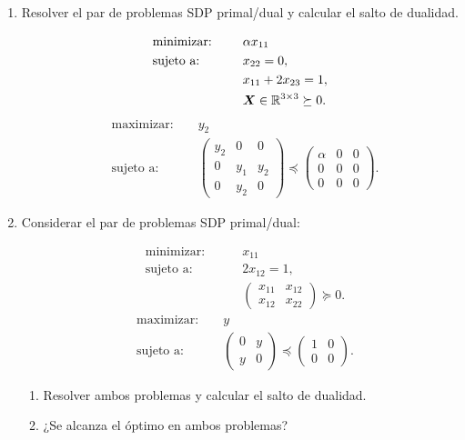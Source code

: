 \documentclass[11pt]{article}
\begin{document}
\begin{enumerate}[resume]
\item Resolver el par de problemas SDP primal/dual y calcular el salto de dualidad.
\begin{multicols}{2}
\noindent
\begin{alignat*}{2}
  & \text{minimizar: } & & \alpha x_{11} \\
  & \text{sujeto a: } & \quad & x_{22} = 0, \\
  & & \quad & x_{11} + 2x_{23} = 1, \\
  & & \quad & \Xb \in \R^{3 \times 3} \succeq 0.
\end{alignat*}
\begin{alignat*}{2}
  & \text{maximizar: } & & y_2 \\
  & \text{sujeto a: } & & \begin{pmatrix} y_2 & 0 & 0 \\ 0 & y_1 & y_2 \\ 0 & y_2 & 0  \end{pmatrix} \preceq \begin{pmatrix} \alpha & 0 & 0 \\ 0 & 0 & 0 \\ 0 & 0 & 0 \end{pmatrix}.
\end{alignat*}
\end{multicols}

\item Considerar el par de problemas SDP primal/dual:
\begin{multicols}{2}
\noindent
\begin{alignat*}{2}
  & \text{minimizar: } & & x_{11} \\
  & \text{sujeto a: } & \quad & 2x_{12} = 1, \\
  & & & \begin{pmatrix} x_{11} & x_{12} \\ x_{12} & x_{22}  \end{pmatrix} \succeq 0.
\end{alignat*}
\begin{alignat*}{2}
  & \text{maximizar: } & & y \\
  & \text{sujeto a: } & & \begin{pmatrix} 0 & y \\ y & 0  \end{pmatrix} \preceq \begin{pmatrix} 1 & 0 \\ 0 & 0  \end{pmatrix}.
\end{alignat*}
\end{multicols}

\begin{enumerate}
\item Resolver ambos problemas y calcular el salto de dualidad.
\item ¿Se alcanza el óptimo en ambos problemas?
\end{enumerate}

\end{enumerate}
\end{document}
